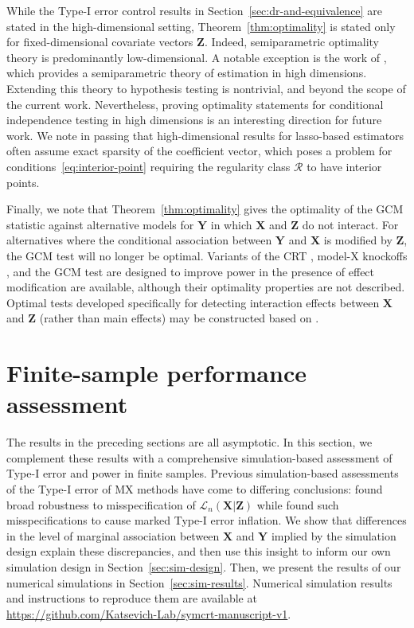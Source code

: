 \documentclass[12pt]{article}
\theoremstyle{definition}
\theoremstyle{remark}
\newcommand{\prx}{\bm X}								%
\newcommand{\prz}{\bm Z}								%
\newcommand{\pry}{{\bm Y}}								%
\newcommand{\law}{\mathcal L}							%
\newcommand{\regclass}{\mathscr R}					    %
\begin{document}
	While the Type-I error control results in Section~\ref{sec:dr-and-equivalence} are stated in the high-dimensional setting, Theorem~\ref{thm:optimality} is stated only for fixed-dimensional covariate vectors $\prz$. Indeed, semiparametric optimality theory is predominantly low-dimensional. A notable exception is the work of \citet{Jankova2018a}, which provides a semiparametric theory of estimation in high dimensions. Extending this theory to hypothesis testing is nontrivial, and beyond the scope of the current work. Nevertheless, proving optimality statements for conditional independence testing in high dimensions is an interesting direction for future work. We note in passing that high-dimensional results for lasso-based estimators often assume exact sparsity of the coefficient vector, which poses a problem for conditions~\eqref{eq:interior-point} requiring the regularity class $\regclass$ to have interior points.
	
	Finally, we note that Theorem~\ref{thm:optimality} gives the optimality of the GCM statistic against alternative models for $\pry$ in which $\prx$ and $\prz$ do not interact. For alternatives where the conditional association between $\pry$ and $\prx$ is modified by $\prz$,  the GCM test will no longer be optimal. Variants of the CRT \citep{Zhong2021, Sesia2022}, model-X knockoffs \citep{Li2021b}, and the GCM test \citep{Lundborg2022} are designed to improve power in the presence of effect modification are available, although their optimality properties are not described. Optimal tests developed specifically for detecting interaction effects between $\bm X$ and $\bm Z$ (rather than main effects) may be constructed based on \citet{Vansteelandt2008}.
	
	\section{Finite-sample performance assessment} \label{sec:simulations}
	
	The results in the preceding sections are all asymptotic. In this section, we complement these results with a comprehensive simulation-based assessment of Type-I error and power in finite samples. Previous simulation-based assessments of the Type-I error of MX methods have come to differing conclusions: \citet{SetC17, Romano2019a, SetS19, Liu2022a} found broad robustness to misspecification of $\law_n(\prx|\prz)$ while \citet{Li2022} found such misspecifications to cause marked Type-I error inflation. We show that differences in the level of marginal association between $\prx$ and $\pry$ implied by the simulation design explain these discrepancies, and then use this insight to inform our own simulation design in Section~\ref{sec:sim-design}. Then, we present the results of our numerical simulations in Section~\ref{sec:sim-results}. Numerical simulation results and instructions to reproduce them are available at \url{https://github.com/Katsevich-Lab/symcrt-manuscript-v1}.	
\end{document}
